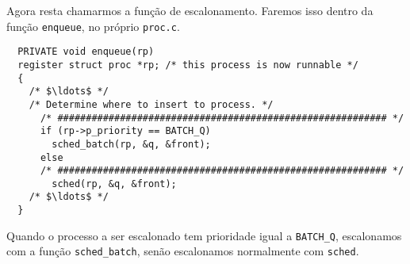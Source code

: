 \documentclass{amsart}
\theoremstyle{plain}
\newcommand{\code}[1]{\lstinline[mathescape=true]{#1}}
\begin{document}
Agora resta chamarmos a função de escalonamento. Faremos isso dentro da função \code{enqueue}, no
próprio \code{proc.c}.

\begin{verbatim}
  PRIVATE void enqueue(rp)
  register struct proc *rp; /* this process is now runnable */
  {
    /* $\ldots$ */
    /* Determine where to insert to process. */
      /* ########################################################## */
      if (rp->p_priority == BATCH_Q)
        sched_batch(rp, &q, &front);
      else
      /* ########################################################## */
        sched(rp, &q, &front);
    /* $\ldots$ */
  }
\end{verbatim}

Quando o processo a ser escalonado tem prioridade igual a \code{BATCH_Q}, escalonamos com a função
\code{sched_batch}, senão escalonamos normalmente com \code{sched}.
\end{document}
